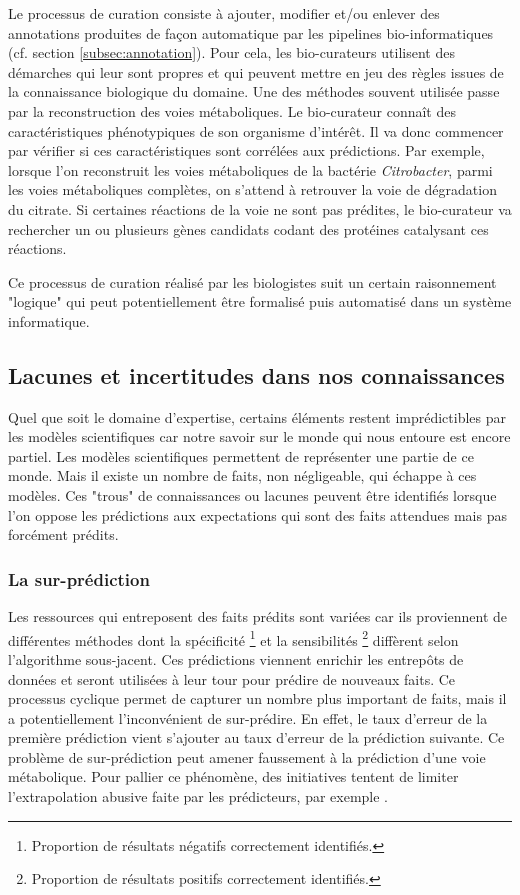 \begin{refsegment}
    Le processus de curation consiste à ajouter, modifier et/ou enlever des annotations produites de façon automatique par les pipelines bio-informatiques (cf. section \cref{subsec:annotation}). Pour cela, les bio-curateurs utilisent des démarches qui leur sont propres et qui peuvent mettre en jeu des règles issues de la connaissance biologique du domaine. Une des méthodes souvent utilisée passe par la reconstruction des voies métaboliques. Le bio-curateur connaît des caractéristiques phénotypiques de son organisme d’intérêt. Il va donc commencer par vérifier si ces caractéristiques sont corrélées aux prédictions. Par exemple, lorsque l’on reconstruit les voies métaboliques de la bactérie \textit{Citrobacter}, parmi les voies métaboliques complètes, on s’attend à retrouver la voie de dégradation du citrate. Si certaines réactions de la voie ne sont pas prédites, le bio-curateur va rechercher un ou plusieurs gènes candidats codant des protéines catalysant ces réactions.
    
    Ce processus de curation réalisé par les biologistes suit un certain raisonnement "logique" qui peut potentiellement être formalisé puis automatisé dans un système informatique.
    
    \subsection{Lacunes et incertitudes dans nos connaissances}\label{subsec:lacunes}
    
    Quel que soit le domaine d’expertise, certains éléments restent imprédictibles par les modèles scientifiques car notre savoir sur le monde qui nous entoure est encore partiel. Les modèles scientifiques permettent de représenter une partie de ce monde. Mais il existe un nombre de faits, non négligeable, qui échappe à ces  modèles. Ces "trous" de connaissances ou lacunes peuvent être identifiés lorsque l’on oppose les prédictions aux expectations qui sont des faits attendues mais pas forcément prédits.
    
    \subsubsection{La sur-prédiction}
    
    Les ressources qui entreposent des faits prédits sont variées car ils proviennent de différentes méthodes dont la spécificité \footnote{Proportion de résultats négatifs correctement identifiés.} et la sensibilités \footnote{Proportion de résultats positifs correctement identifiés.} diffèrent selon l’algorithme sous-jacent. Ces prédictions viennent enrichir les entrepôts de données et seront utilisées à leur tour pour prédire de nouveaux faits. Ce processus cyclique permet de capturer un nombre plus important de faits, mais il a potentiellement l’inconvénient de sur-prédire. En effet, le taux d’erreur de la première prédiction vient s’ajouter au taux d’erreur de la prédiction suivante. Ce problème de sur-prédiction peut amener faussement à la prédiction d'une voie métabolique. Pour pallier ce phénomène, des initiatives tentent de limiter l’extrapolation abusive faite par les prédicteurs, par exemple \citeauthor{pfeiffer2015manual}.
    

\end{refsegment}
